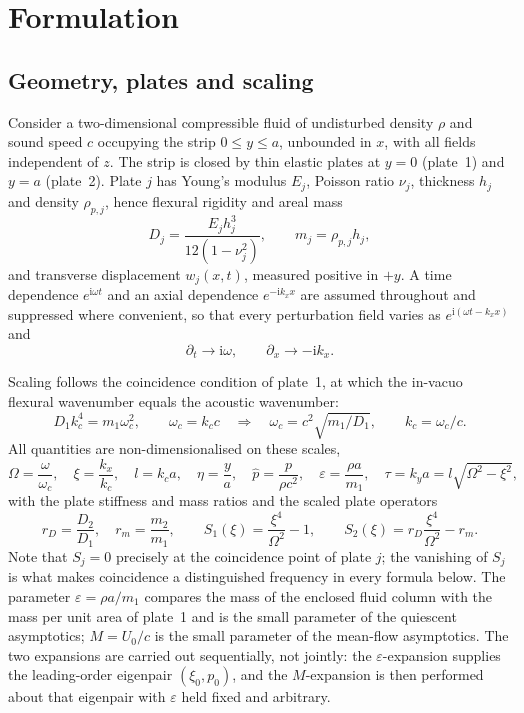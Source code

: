 \documentclass[11pt,a4paper]{article}
\newcommand{\Om}{\Omega}
\newcommand{\eps}{\varepsilon}
\newcommand{\ii}{\mathrm{i}}
\theoremstyle{plain}
\theoremstyle{remark}
\begin{document}
\section{Formulation}\label{sec:formulation}

\subsection{Geometry, plates and scaling}
Consider a two-dimensional compressible fluid of undisturbed density $\rho$ and sound speed $c$
occupying the strip $0\le y\le a$, unbounded in $x$, with all fields independent of $z$. The strip is
closed by thin elastic plates at $y=0$ (plate~1) and $y=a$ (plate~2). Plate $j$ has Young's modulus
$E_j$, Poisson ratio $\nu_j$, thickness $h_j$ and density $\rho_{p,j}$, hence flexural rigidity and
areal mass
\begin{equation}
D_j=\frac{E_jh_j^3}{12(1-\nu_j^2)},\qquad m_j=\rho_{p,j}h_j ,
\label{eq:plateprops}
\end{equation}
and transverse displacement $w_j(x,t)$, measured positive in $+y$. A time dependence $e^{\ii\omega t}$
and an axial dependence $e^{-\ii k_xx}$ are assumed throughout and suppressed where convenient, so that
every perturbation field varies as $e^{\ii(\omega t-k_xx)}$ and
\begin{equation}
\partial_t\to\ii\omega,\qquad \partial_x\to-\ii k_x .
\end{equation}

Scaling follows the coincidence condition of plate~1, at which the in-vacuo flexural wavenumber equals
the acoustic wavenumber:
\begin{equation}
D_1k_c^4=m_1\omega_c^2,\qquad \omega_c=k_cc
\quad\Longrightarrow\quad
\omega_c=c^2\sqrt{m_1/D_1},\qquad k_c=\omega_c/c .
\label{eq:coincidence}
\end{equation}
All quantities are non-dimensionalised on these scales,
\begin{equation}
\Om=\frac{\omega}{\omega_c},\quad
\xi=\frac{k_x}{k_c},\quad
l=k_ca,\quad
\eta=\frac{y}{a},\quad
\hat p=\frac{p}{\rho c^2},\quad
\eps=\frac{\rho a}{m_1},\quad
\tau=k_ya=l\sqrt{\Om^2-\xi^2},
\label{eq:nondim}
\end{equation}
with the plate stiffness and mass ratios and the scaled plate operators
\begin{equation}
r_D=\frac{D_2}{D_1},\quad r_m=\frac{m_2}{m_1},\qquad
S_1(\xi)=\frac{\xi^4}{\Om^2}-1,\qquad
S_2(\xi)=r_D\frac{\xi^4}{\Om^2}-r_m .
\label{eq:Sdef}
\end{equation}
Note that $S_j=0$ precisely at the coincidence point of plate $j$; the vanishing of $S_j$ is what makes
coincidence a distinguished frequency in every formula below. The parameter $\eps=\rho a/m_1$ compares
the mass of the enclosed fluid column with the mass per unit area of plate~1 and is the small parameter
of the quiescent asymptotics; $M=U_0/c$ is the small parameter of the mean-flow asymptotics. The two
expansions are carried out sequentially, not jointly: the $\eps$-expansion supplies the leading-order
eigenpair $(\xi_0,p_0)$, and the $M$-expansion is then performed about that eigenpair with $\eps$ held
fixed and arbitrary.
\end{document}
